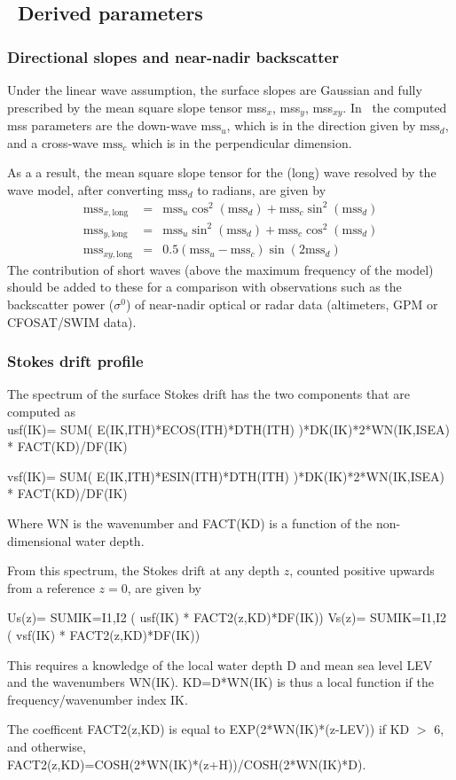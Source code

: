 \vssub
\subsection{~Derived parameters} \label{sub:outpars}
\vssub

\subsubsection{Directional slopes and near-nadir backscatter}
Under the linear wave assumption, the surface slopes are Gaussian and fully prescribed by the 
mean square slope tensor mss$_x$, mss$_y$, mss$_{xy}$. In \ws\ the computed mss parameters are the down-wave $\mathrm{mss}_u$, which is 
in the direction given by $\mathrm{mss}_d$, and a cross-wave $\mathrm{mss}_c$ which is in the perpendicular dimension. 

As a a result, the 
mean square slope tensor for the (long) wave resolved by the wave model, after converting $\mathrm{mss}_d$ to radians, are given by 
\begin{eqnarray}
   \mathrm{mss}_{x,\mathrm{long}} &=& \mathrm{mss}_u \cos^2(\mathrm{mss}_d)+\mathrm{mss}_c \sin^2(\mathrm{mss}_d) \\
   \mathrm{mss}_{y,\mathrm{long}} &=& \mathrm{mss}_u \sin^2(\mathrm{mss}_d)+\mathrm{mss}_c \cos^2(\mathrm{mss}_d) \\
   \mathrm{mss}_{xy,\mathrm{long}}&=&0.5 (\mathrm{mss}_u - \mathrm{mss}_c) \sin(2 \mathrm{mss}_d)
\end{eqnarray}
The contribution of short waves (above the maximum frequency of the model) should be added to these for a comparison with observations 
such as the backscatter power ($\sigma^0$) of near-nadir optical or radar data (altimeters, GPM or CFOSAT/SWIM data).
   
\subsubsection{Stokes drift profile}
The spectrum of the surface Stokes drift has the two components that are computed as \\
{\code usf(IK)= SUM( E(IK,ITH)*ECOS(ITH)*DTH(ITH) )*DK(IK)*2*WN(IK,ISEA) *  FACT(KD)/DF(IK)}

{\code vsf(IK)= SUM( E(IK,ITH)*ESIN(ITH)*DTH(ITH) )*DK(IK)*2*WN(IK,ISEA) *  FACT(KD)/DF(IK)}

Where WN is the wavenumber and FACT(KD) is a function of the non-dimensional water depth.

From this spectrum, the Stokes drift at any depth $z$, counted positive upwards from a reference $z=0$, are given by

Us(z)= SUM{IK=I1,I2} ( usf(IK) * FACT2(z,KD)*DF(IK))
Vs(z)= SUM{IK=I1,I2} ( vsf(IK) * FACT2(z,KD)*DF(IK))

This requires a knowledge of the local water depth D and mean sea level LEV and the wavenumbers WN(IK). KD=D*WN(IK) is thus a local function if the frequency/wavenumber index IK.

The coefficent FACT2(z,KD) is equal to EXP(2*WN(IK)*(z-LEV)) if KD $>$ 6, and otherwise, \\
FACT2(z,KD)=COSH(2*WN(IK)*(z+H))/COSH(2*WN(IK)*D).
